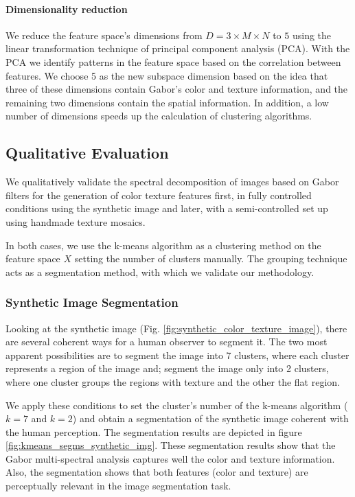 \documentclass[journal]{IEEEtran}
\begin{document}
\paragraph{Dimensionality reduction}
We reduce the feature space's dimensions from $D =3 \times M \times N$ to $5$ using the linear transformation technique of principal component analysis (PCA). With the PCA we identify patterns in the feature space based on the correlation between features. We choose 5 as the new subspace dimension based on the idea that three of these dimensions contain Gabor's color and texture information, and the remaining two dimensions contain the spatial information. In addition, a low number of dimensions speeds up the calculation of clustering algorithms.

\subsection{Qualitative Evaluation}
We qualitatively validate the spectral decomposition of images based on Gabor filters for the generation of color texture features first, in fully controlled conditions using the synthetic image and later, with a semi-controlled set up using handmade texture mosaics.

In both cases, we use the k-means algorithm as a clustering method on the feature space $X$ setting the number of clusters manually. The grouping technique acts as a segmentation method, with which we validate our methodology.

\subsubsection{Synthetic Image Segmentation}
Looking at the synthetic image (Fig. \ref{fig:synthetic_color_texture_image}),  there are several coherent ways for a human observer to segment it. The two most apparent possibilities are to segment the image into 7 clusters, where each cluster represents a region of the image and; segment the image only into 2 clusters, where one cluster groups the regions with texture and the other the flat region. 

We apply these conditions to set the cluster's number of the k-means algorithm ($k = 7$ and $k = 2$) and obtain a segmentation of the synthetic image coherent with the human perception. The segmentation results are depicted in figure  \ref{fig:kmeans_segms_synthetic_img}. These segmentation results show that the Gabor multi-spectral analysis captures well the color and texture information. Also, the segmentation shows that both features (color and texture) are perceptually relevant in the image segmentation task.  
\end{document}

